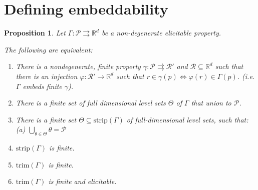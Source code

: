 \documentclass[12pt]{article}
\newcommand{\Comments}{1}
\newcommand{\mynote}[2]{\ifnum\Comments=1\textcolor{#1}{#2}\fi}
\newcommand{\jessie}[1]{\mynote{purple}{[JF: #1]}}
\newcommand{\reals}{\mathbb{R}}
\renewcommand{\P}{\mathcal{P}}
\newcommand{\R}{\mathcal{R}}
\newcommand{\inter}[1]{\mathring{#1}}%
\newcommand{\toto}{\rightrightarrows}
\newcommand{\trim}{\mathrm{trim}}
\newcommand{\strip}{\mathrm{strip}}
\newtheorem{proposition}{Proposition}
\begin{document}
%
%
%
%
%




\section{Defining embeddability}


\begin{proposition}\label{prop:optimal-reports-per-level-set}
  Let $\Gamma:\P\toto\reals^d$ be a non-degenerate elicitable property.

  The following are equivalent:
  \begin{enumerate}
  \item There is a nondegenerate, finite property $\gamma:\P\toto\R'$ and $\R \subseteq \reals^d$ such that there is an injection $\varphi:\R'\to\reals^d$ such that $r\in\gamma(p) \iff \varphi(r) \in \Gamma(p)$. (i.e. $\Gamma$ embeds finite $\gamma$).  
  \item There is a finite set of full dimensional level sets $\Theta$ of $\Gamma$ that union to $\P$.
  \item There is a finite set $\Theta \subseteq \strip(\Gamma)$ of full-dimensional level sets, such that: (a) $\bigcup_{\theta\in\Theta} \theta = \P$%
  \item $\strip(\Gamma)$ is finite.
  \item $\trim(\Gamma)$ is finite.
  \item $\trim(\Gamma)$ is finite and elicitable.

  
  \end{enumerate}
\end{proposition}
\end{document}
